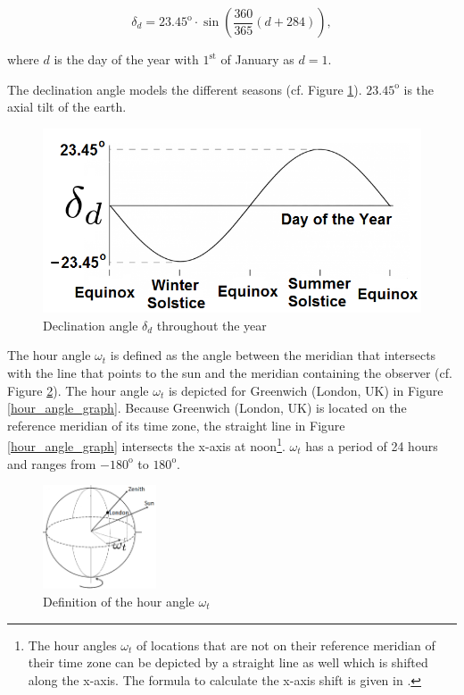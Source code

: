 \begin{equation} \label{delta}
\delta_d=23.45^\mathrm{o} \cdot \sin\left(\frac{360}{365} (d+284)\right),
\end{equation}


where $d$ is the day of the year with $1^{\mathrm{st}}$ of January as $d = 1$.

The declination angle models the different seasons (cf. Figure \ref{decli}). $23.45^{\mathrm{o}}$ is the axial tilt of the earth.


\begin{figure}[H]
	\centering
		\includegraphics[width=0.6\columnwidth]{pictures/decli}
\caption{Declination angle $\delta_d$ throughout the year\label{decli}}
\end{figure}


The hour angle $\omega_t$ is defined as the angle between the meridian that intersects with the line that points to the sun and the meridian containing the observer (cf. Figure \ref{hour_angle}). 
The hour angle $\omega_t$ is depicted for Greenwich (London, UK) in Figure \ref{hour_angle_graph}. Because Greenwich (London, UK) is located on the reference meridian of its time zone, the straight line in Figure \ref{hour_angle_graph} intersects the x-axis at noon\footnote{The hour angles $\omega_t$ of locations that are not on their reference meridian of their time zone can be depicted by a straight line as well which is shifted along the x-axis. The formula to calculate the x-axis shift is given in \cite{Solar_Cell_hour_angle}.}. $\omega_t$ has a period of 24 hours and ranges from $-180^{\mathrm{o}}$ to $180^{\mathrm{o}}$.




\begin{figure} [H]
	\centering
		\includegraphics[width=0.3\textwidth]{pictures/hour_angle}
		\caption{Definition of the hour angle $\omega_t$\label{hour_angle}}
\end{figure}



